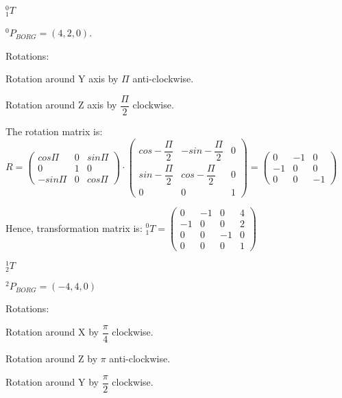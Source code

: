 \documentclass[12pt]{article}
\begin{document}
\begin{list}{)~}{}
\item
$_{1}^{0}T$

$^0 P_{BORG} = \left(4, 2, 0\right)$.

Rotations:

\begin{list}{)~}{}
\item Rotation around Y axis by $\Pi$ anti-clockwise.
\item Rotation around Z axis by $\dfrac{\Pi}{2}$ clockwise.
\end{list}

The rotation matrix is:
$R=\left(\begin{array}{ccc}
cos \Pi & 0 & sin \Pi \\
0 & 1 & 0 \\
-sin \Pi & 0 & cos \Pi \end{array}\right) \cdot 
\left(\begin{array}{ccc}
cos - \dfrac{\Pi}{2} & -sin - \dfrac{\Pi}{2} & 0 \\
sin - \dfrac{\Pi}{2} & cos - \dfrac{\Pi}{2} & 0 \\
0 & 0 & 1\end{array}\right) = 
\left(\begin{array}{ccc}
0 & -1 & 0 \\
-1 & 0 & 0 \\
0 & 0 & -1\end{array}\right)$

Hence, transformation matrix is:
$_{1}^{0}T = \left(\begin{array}{cccc}
0 & -1 & 0 & 4 \\
-1 & 0 & 0 & 2\\
0 & 0 & -1 & 0\\
0 & 0 & 0 & 1\end{array}\right)$

\item
$_{2}^1T$

$^2 P_{BORG} = \left(-4, 4, 0\right)$

Rotations:
\begin{list}{)~}{}
\item Rotation around X by $\dfrac{\pi}{4}$ clockwise.
\item Rotation around Z by $\pi$ anti-clockwise.
\item Rotation around Y by $\dfrac{\pi}{2}$ clockwise.
\end{list}


\end{list}
\end{document}

